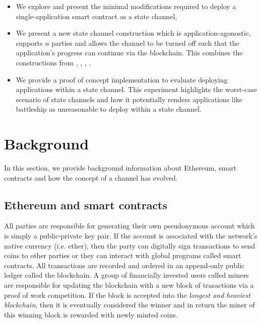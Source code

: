 \documentclass{llncs}
\begin{document}
\begin{itemize}
\item We explore and present the minimal modifications required to deploy a single-application smart contract as a state channel, 
\item We present a new state channel construction which is application-agonostic, supports $n$ parties and allows the channel to be turned off such that the application's progress can continue via the blockchain. This combines the constructions from \cite{miller2017sprites}, \cite{mccorry2018pisa}, \cite{dziembowski2017perun}, \cite{croman2016scaling}. 
\item We provide a proof of concept implementation to evaluate deploying applications within a state channel.
This experiment highlights the worst-case scenario of state channels and how it potentially renders applications like battleship as unreasonable to deploy within a state channel. 
\end{itemize}

\section{Background}

In this section, we provide background information about Ethereum, smart contracts and how the concept of a channel has evolved. 

\subsection{Ethereum and smart contracts}

All parties are responsible for generating their own pseudonymous account which is simply a public-private key pair. 
If the account is associated with the network's native currency (i.e. ether), then the party can digitally sign transactions to send coins to other parties or they can interact with global programs called smart contracts. 
All transactions are recorded and ordered in an append-only public ledger called the blockchain.
A group of financially invested users called miners are responsible for updating the blockchain with a new block of trasactions via a proof of work competition. 
If the block is accepted into the \textit{longest and heaviest blockchain}, then it is eventually considered the winner and in return the miner of this winning block is rewarded with newly minted coins. 
\end{document}
